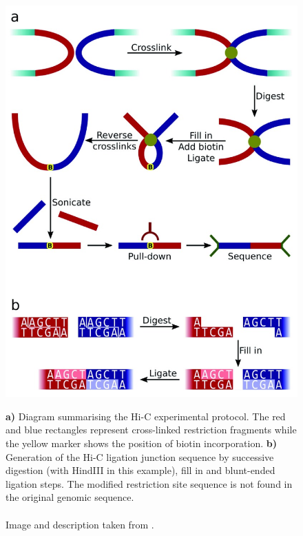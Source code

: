 \begin{figure}[t]
\begin{centering}
    {\includegraphics[scale=4]{figures/background/f1000research-4-7903-g0000.jpg}}
    \caption[Summarised Hi-C protocol]
    {\textbf{a)} Diagram summarising the Hi-C experimental protocol. The red and blue rectangles represent cross-linked restriction fragments while the yellow marker shows the position of biotin incorporation. \textbf{b)} Generation of the Hi-C ligation junction sequence by successive digestion (with HindIII in this example), fill in and blunt-ended ligation steps. The modified restriction site sequence is not found in the original genomic sequence. \\ \\ Image and description taken from \cite{wingett2015hicup}.}
    \label{fig:HiC}

\end{centering}
\end{figure}



